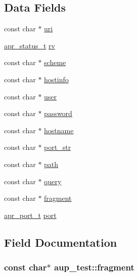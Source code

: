 \subsection*{Data Fields}
\begin{DoxyCompactItemize}
\item 
const char $\ast$ \hyperlink{structaup__test_a9c44e811e9ea1e4da6a453d876f6a2e4}{uri}
\item 
\hyperlink{group__apr__errno_gaa5105fa83cc322f09382292db8b47593}{apr\+\_\+status\+\_\+t} \hyperlink{structaup__test_a8c73099b5f7f9c19347aead4759c90b2}{rv}
\item 
const char $\ast$ \hyperlink{structaup__test_a195e0e419638730c0ea2b2441e74e703}{scheme}
\item 
const char $\ast$ \hyperlink{structaup__test_a815ca64171e92dabbed6efe1e8fcd2b7}{hostinfo}
\item 
const char $\ast$ \hyperlink{structaup__test_a8475b5c7f705a1c1a6359f14b8334f85}{user}
\item 
const char $\ast$ \hyperlink{structaup__test_a838e6baeddfb1bc2d27d863dd44dc0bf}{password}
\item 
const char $\ast$ \hyperlink{structaup__test_a8da6e4ebb758793a1ce5b67a10a9554b}{hostname}
\item 
const char $\ast$ \hyperlink{structaup__test_aa00597cfee470cf3a5ebb4288d179de2}{port\+\_\+str}
\item 
const char $\ast$ \hyperlink{structaup__test_a5f8e64619d47b5000d0060776c027350}{path}
\item 
const char $\ast$ \hyperlink{structaup__test_a9f0d5cdbec9845c74d176c78af51af3c}{query}
\item 
const char $\ast$ \hyperlink{structaup__test_a2b4d5f960f5cf8ab29a23ba1a9a67717}{fragment}
\item 
\hyperlink{group__apr__network__io_gaa670a71960f6eb4fe0d0de2a1e7aba03}{apr\+\_\+port\+\_\+t} \hyperlink{structaup__test_a52ce2562fa71a4e5439501eac1f06608}{port}
\end{DoxyCompactItemize}


\subsection{Field Documentation}
\subsubsection[{\texorpdfstring{fragment}{fragment}}]{\setlength{\rightskip}{0pt plus 5cm}const char$\ast$ aup\+\_\+test\+::fragment}\hypertarget{structaup__test_a2b4d5f960f5cf8ab29a23ba1a9a67717}{}\label{structaup__test_a2b4d5f960f5cf8ab29a23ba1a9a67717}
